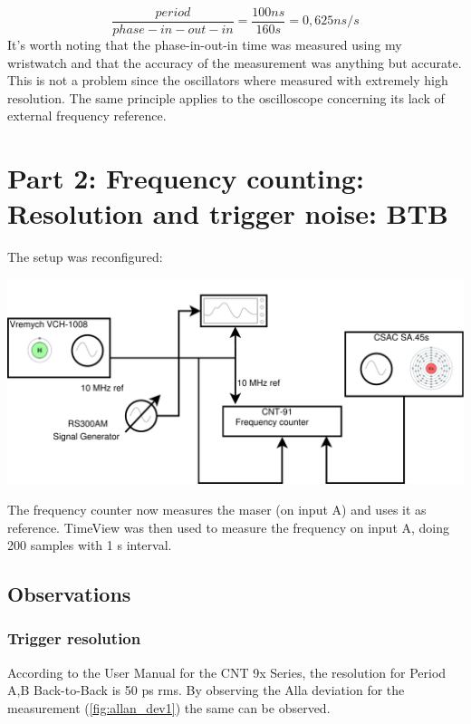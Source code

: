 \documentclass[11pt,english,a4paper]{article}
\begin{document}
\begin{displaymath}
\frac{period}{phase-in-out-in} = \frac{100 ns}{160 s} = 0,625 ns/s
\end{displaymath}
\newline
It's worth noting that the phase-in-out-in time was measured using my wristwatch and that the accuracy of the measurement was anything but accurate. This is not a problem since the oscillators where measured with extremely high resolution.
The same principle applies to the oscilloscope concerning its lack of external frequency reference.   
\newpage

\section{Part 2: Frequency counting: Resolution and trigger noise: BTB}
The setup was reconfigured:
\begin{center}
\includegraphics[width=1 \textwidth]{lab_report_diagram_del2.pdf}
\end{center}
The frequency counter now measures the maser (on input A) and uses it as reference. TimeView was then used to measure the frequency on input A, doing 200 samples with 1 s interval.

\subsection{Observations}
\subsubsection{Trigger resolution}
According to the User Manual for the CNT 9x Series, the resolution for Period A,B Back-to-Back is 50 ps rms. By observing the Alla deviation for the measurement (\ref{fig:allan_dev1}) the same can be observed.
\end{document}
